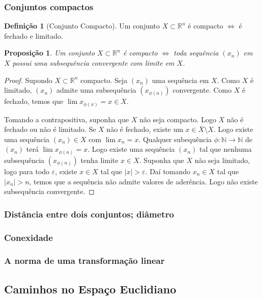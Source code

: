 \documentclass{article}
\newtheorem{prop}{Proposição}[section]
\theoremstyle{theorem}
\theoremstyle{lemma}
\theoremstyle{definition}
\newtheorem{definicao}{Definição}[section]
\theoremstyle{remark}
\begin{document}
   \subsubsection{ Conjuntos compactos}
\begin{definicao}[Conjunto Compacto]
	Um conjunto $X\subset \mathbb{R}^n$ é compacto $\iff $ é fechado e limitado.
\end{definicao}
\begin{prop}
	Um conjunto $X\subset \mathbb{R}^n$ é compacto $\iff$ toda sequência $(x_n)$  em $X$ possui uma subsequência convergente com limite em $X$.
\end{prop}
\begin{proof}
	Supondo $X\subset\mathbb{R}^n$ compacto. Seja $(x_n)$ uma sequência em $X$. Como $X$ é limitado, $(x_n)$ admite uma subsequência $(x_{\phi(n)})$ convergente. Como $X$ é fechado, temos que $\lim x_{\phi(x)}= x\in X$.

	Tomando a contrapositiva, suponha que $X$ não seja compacto. Logo $X$ não é fechado ou não é limitado. Se $X$ não é fechado, existe um $x\in \overline{X} \setminus X$. Logo existe uma sequência $(x_n)\in X$ com $\lim x_n = x$. Qualquer subequência $\phi:\mathbb{N}\to \mathbb{N}$  de $(x_n)$ terá $\lim x_{\phi(n)} = x$. Logo existe uma sequência $(x_n)$ tal que nenhuma subsequência $(x_{\phi(n)})$ tenha limite $x\in X$.
	Suponha que $X$ não seja limitado, logo para todo $\varepsilon$, existe $x\in X$ tal que $|x| > \varepsilon$. Daí tomando $x_n\in X$ tal que $|x_n| > n$, temos que a sequência não admite valores de aderência. Logo não existe subsequência convergente.

\end{proof}
   \subsubsection{ Distância entre dois conjuntos; diâmetro}
   \subsubsection{ Conexidade}
   \subsubsection{ A norma de uma transformação linear}
\subsection{ Caminhos no Espaço Euclidiano}
\end{document}
